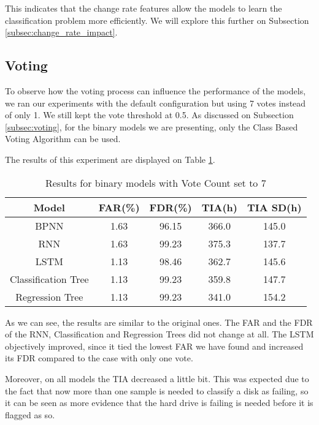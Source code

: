 This indicates that the change rate features allow the models to learn the classification problem more efficiently.
We will explore this further on Subsection \ref{subsec:change_rate_impact}.

\subsection{Voting}

To observe how the voting process can influence the performance of the models, we ran our experiments with the default configuration but using 7 votes instead of only 1.
We still kept the vote threshold at 0.5.
As discussed on Subsection \ref{subsec:voting}, for the binary models we are presenting, only the Class Based Voting Algorithm can be used.

The results of this experiment are displayed on Table \ref{table:results_binary_voting}. 

\begin{table}
  \begin{center}
    \begin{tabular}{|c|c|c|c|c|}
      \hline
    Model & FAR(\%) & FDR(\%) & TIA(h) & TIA SD(h) \\
    \hline
    BPNN & 1.63 & 96.15 & 366.0 & 145.0 \\
    RNN & 1.63 & 99.23 & 375.3 & 137.7 \\
    LSTM & 1.13 & 98.46 & 362.7 & 145.6\\
    Classification Tree & 1.13 & 99.23 & 359.8 & 147.7 \\
    Regression Tree & 1.13 & 99.23 & 341.0 & 154.2 \\
    \hline
    \end{tabular}
    \caption[Results Binary Models with Voting]{Results for binary models with Vote Count set to 7}
    \label{table:results_binary_voting}
  \end{center}
\end{table}

As we can see, the results are similar to the original ones.
The FAR and the FDR of the RNN, Classification and Regression Trees did not change at all.
The LSTM objectively improved, since it tied the lowest FAR we have found and increased its FDR compared to the case with only one vote. 

Moreover, on all models the TIA decreased a little bit.
This was expected due to the fact that now more than one sample is needed to classify a disk as failing, so it can be seen as more evidence that the hard drive is failing is needed before it is flagged as so.

